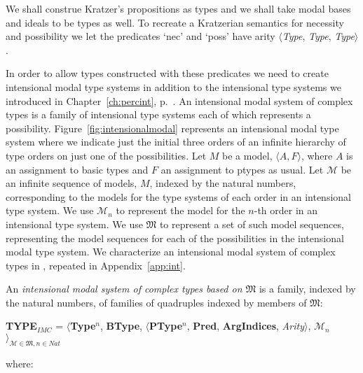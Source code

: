 We shall construe Kratzer's propositions as types and we shall take
modal bases and ideals to be types as well.  To recreate a Kratzerian
semantics for necessity and possibility we let the predicates `nec'
and `poss' have arity $\langle$\textit{Type}, \textit{Type},
\textit{Type}$\rangle$.
\begin{shaded}
In order to allow types constructed with these predicates we need to
create intensional modal type systems in addition to the intensional
type systems we introduced in Chapter~\ref{ch:percint},
p.~\pageref{ex:int-type-sys}.  An intensional modal system of complex
types is a family of intensional type systems each of which represents
a possibility. %
Figure~\ref{fig:intensionalmodal} represents an intensional modal type
system where we indicate just the initial
three orders of an infinite hierarchy of type orders on just one of
the possibilities.  Let $M$ be a model, $\langle A,F\rangle$, where
$A$ is an assignment to basic types and $F$ an assignment to ptypes as
usual.  Let $\mathcal{M}$ be an infinite sequence of models, $M$, indexed by
the natural numbers, corresponding to the models for the type systems
of each order in an intensional type system.  We use $\mathcal{M}_n$
to represent the model for the $n$-th order in an intensional type
system.  We use $\mathfrak{M}$ to represent a set of such model
sequences, representing the model sequences for each of the
possibilities in the intensional modal type system.  We characterize
an intensional modal system of complex types in \nexteg{}, repeated in
Appendix~\ref{app:int}.
\begin{ex} 
 An {\it intensional modal system of complex types based on $\mathfrak{M}$\/} is a family,
indexed by the natural numbers, of families of quadruples indexed by
members of $\mathfrak{M}$:
\begin{display}
{\bf TYPE$_\mathit{IMC}$} = $\langle${\bf Type}$^n$, {\bf BType},
$\langle$\textbf{PType}$^n$, {\bf Pred}, \textbf{ArgIndices}, {\it
  Arity\/}$\rangle$, $\mathscr{M}_n$$\rangle_{\mathscr{M}\in\mathfrak{M},n\in\mathit{Nat}}$
\end{display}
where:
\begin{enumerate} 
 

\end{enumerate}
\end{ex}
\end{shaded}
